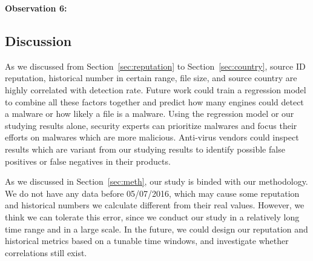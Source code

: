 {\bf Observation 6:} 
{\em }

\subsection{Discussion}

As we discussed from Section~\ref{sec:reputation} to Section~\ref{sec:country}, 
source ID reputation, historical number in certain range, file size, 
and source country are highly correlated with detection rate. 
Future work could train a regression model to combine all these factors together and 
predict how many engines could detect a malware or how likely a file is a malware. 
Using the regression model or our studying results alone, 
security experts can prioritize malwares and focus their efforts on malwares which are more malicious. 
Anti-virus vendors could inspect results which are variant from our studying results 
to identify possible false positives or false negatives in their products. 

As we discussed in Section~\ref{sec:meth}, our study is binded with our methodology.
We do not have any data before 05/07/2016, 
which may cause some reputation and historical numbers 
we calculate different from their real values. 
However, we think we can tolerate this error, 
since we conduct our study in a relatively long time range and in a large scale. 
In the future, we could design our reputation and historical metrics based on a tunable time windows, and investigate whether correlations still exist.   
